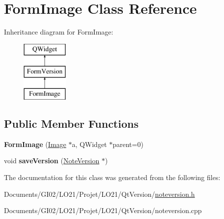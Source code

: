 \hypertarget{class_form_image}{}\section{Form\+Image Class Reference}
\label{class_form_image}
Inheritance diagram for Form\+Image\+:\begin{figure}[H]
\begin{center}
\leavevmode
\includegraphics[height=3.000000cm]{class_form_image}
\end{center}
\end{figure}
\subsection*{Public Member Functions}
\begin{DoxyCompactItemize}
\item 
\mbox{\label{class_form_image_aea7e0896a70f60a08fedc80a87cb6534}} 
{\bfseries Form\+Image} (\hyperlink{class_image}{Image} $\ast$a, Q\+Widget $\ast$parent=0)
\item 
\mbox{\label{class_form_image_a3fb6e3870e4c2217c9c7a58fe67072d3}} 
void {\bfseries save\+Version} (\hyperlink{class_note_version}{Note\+Version} $\ast$)
\end{DoxyCompactItemize}


The documentation for this class was generated from the following files\+:\begin{DoxyCompactItemize}
\item 
Documents/\+G\+I02/\+L\+O21/\+Projet/\+L\+O21/\+Qt\+Version/\hyperlink{noteversion_8h}{noteversion.\+h}\item 
Documents/\+G\+I02/\+L\+O21/\+Projet/\+L\+O21/\+Qt\+Version/noteversion.\+cpp\end{DoxyCompactItemize}
